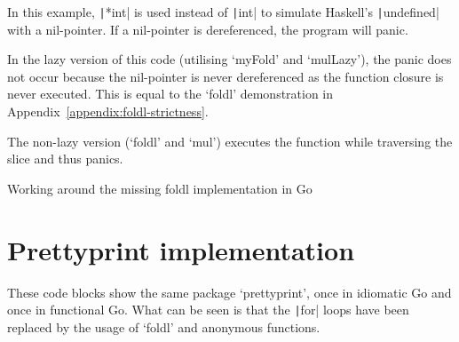 In this example, \texttt|*int| is used instead of \texttt|int| to simulate Haskell's
\texttt|undefined| with a nil-pointer.
If a nil-pointer is dereferenced, the program will panic.

In the lazy version of this code (utilising `myFold' and `mulLazy'), the panic does not occur because
the nil-pointer is never dereferenced as the function closure is never executed. This is equal
to the `foldl' demonstration in Appendix~\ref{appendix:foldl-strictness}.

The non-lazy version (`foldl' and `mul') executes the function while traversing the slice and thus panics.

\begin{code}
	\caption{Working around the missing foldl implementation in Go\label{code:foldl-go}}
\end{code}

\section{Prettyprint implementation}\label{appendix:prettyprint-func}

These code blocks show the same package `prettyprint', once in idiomatic Go and once
in functional Go. What can be seen is that the \texttt|for| loops have been replaced
by the usage of `foldl' and anonymous functions.

